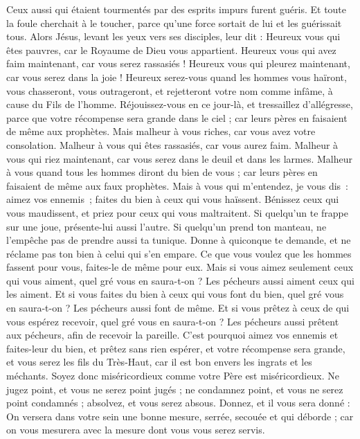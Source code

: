 \begin{multicols}{2}
Ceux aussi qui étaient tourmentés par des esprits impurs furent guéris.
Et toute la foule cherchait à le toucher, parce qu'une force sortait de lui et les guérissait tous.
Alors Jésus, levant les yeux vers ses disciples, leur dit : Heureux vous qui êtes pauvres, car le Royaume de Dieu vous appartient.
Heureux vous qui avez faim maintenant, car vous serez rassasiés ! Heureux vous qui pleurez maintenant, car vous serez dans la joie !
Heureux serez-vous quand les hommes vous haïront, vous chasseront, vous outrageront, et rejetteront votre nom comme infâme, à cause du Fils de l'homme.
Réjouissez-vous en ce jour-là, et tressaillez d'allégresse, parce que votre récompense sera grande dans le ciel ; car leurs pères en faisaient de même aux prophètes.
Mais malheur à vous riches, car vous avez votre consolation.
Malheur à vous qui êtes rassasiés, car vous aurez faim. Malheur à vous qui riez maintenant, car vous serez dans le deuil et dans les larmes.
Malheur à vous quand tous les hommes diront du bien de vous ; car leurs pères en faisaient de même aux faux prophètes.
Mais à vous qui m’entendez, je vous dis : aimez vos ennemis ; faites du bien à ceux qui vous haïssent.
Bénissez ceux qui vous maudissent, et priez pour ceux qui vous maltraitent.
Si quelqu'un te frappe sur une joue, présente-lui aussi l'autre. Si quelqu'un prend ton manteau, ne l'empêche pas de prendre aussi ta tunique.
Donne à quiconque te demande, et ne réclame pas ton bien à celui qui s'en empare.
Ce que vous voulez que les hommes fassent pour vous, faites-le de même pour eux.
Mais si vous aimez seulement ceux qui vous aiment, quel gré vous en saura-t-on ? Les pécheurs aussi aiment ceux qui les aiment.
Et si vous faites du bien à ceux qui vous font du bien, quel gré vous en saura-t-on ? Les pécheurs aussi font de même.
Et si vous prêtez à ceux de qui vous espérez recevoir, quel gré vous en saura-t-on ? Les pécheurs aussi prêtent aux pécheurs, afin de recevoir la pareille.
C'est pourquoi aimez vos ennemis et faites-leur du bien, et prêtez sans rien espérer, et votre récompense sera grande, et vous serez les fils du Très-Haut, car il est bon envers les ingrats et les méchants.
Soyez donc miséricordieux comme votre Père est miséricordieux.
Ne jugez point, et vous ne serez point jugés ; ne condamnez point, et vous ne serez point condamnés ; absolvez, et vous serez absous.
Donnez, et il vous sera donné : On versera dans votre sein une bonne mesure, serrée, secouée et qui déborde ; car on vous mesurera avec la mesure dont vous vous serez servis.

\end{multicols}
